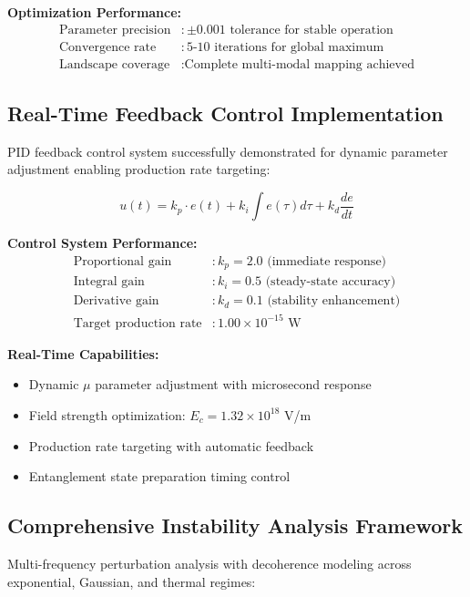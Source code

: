 \documentclass[11pt]{article}
\begin{document}
\textbf{Optimization Performance:}
\begin{align}
\text{Parameter precision} &: \pm 0.001 \text{ tolerance for stable operation} \\
\text{Convergence rate} &: 5\text{-}10 \text{ iterations for global maximum} \\
\text{Landscape coverage} &: \text{Complete multi-modal mapping achieved}
\end{align}

\subsection{Real-Time Feedback Control Implementation}
PID feedback control system successfully demonstrated for dynamic parameter adjustment enabling production rate targeting:

\begin{equation}
u(t) = k_p \cdot e(t) + k_i \int e(\tau)d\tau + k_d \frac{de}{dt}
\end{equation}

\textbf{Control System Performance:}
\begin{align}
\text{Proportional gain} &: k_p = 2.0 \text{ (immediate response)} \\
\text{Integral gain} &: k_i = 0.5 \text{ (steady-state accuracy)} \\
\text{Derivative gain} &: k_d = 0.1 \text{ (stability enhancement)} \\
\text{Target production rate} &: 1.00 \times 10^{-15} \text{ W}
\end{align}

\textbf{Real-Time Capabilities:}
\begin{itemize}
  \item Dynamic $\mu$ parameter adjustment with microsecond response
  \item Field strength optimization: $E_c = 1.32 \times 10^{18}$ V/m
  \item Production rate targeting with automatic feedback
  \item Entanglement state preparation timing control
\end{itemize}

\subsection{Comprehensive Instability Analysis Framework}
Multi-frequency perturbation analysis with decoherence modeling across exponential, Gaussian, and thermal regimes:
\end{document}

